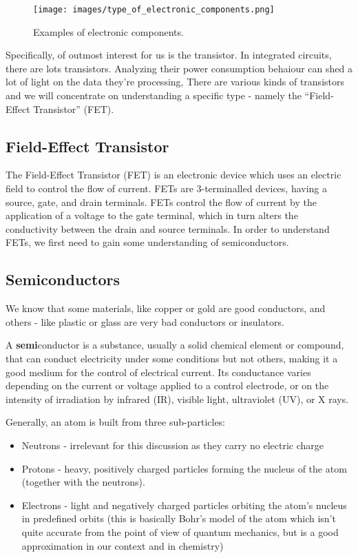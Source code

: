 \begin{figure}[!ht]
	\centering
	\texttt{[image: images/type\_of\_electronic\_components.png]}
	\caption{Examples of electronic components.} \label{fig:type_of_electronic_components}
\end{figure}

Specifically, of outmost interest for us is the transistor. 
In integrated circuits, there are lots transistors. Analyzing their power consumption behaiour can
shed a lot of light on the data they're processing,
There are various kinds of transistors and we will concentrate on understanding a
specific type - namely the ``Field-Effect Transistor'' (FET).

\subsection{Field-Effect Transistor}

The Field-Effect Transistor (FET) is an electronic device which uses an electric
field to control the flow of current. FETs are 3-terminalled devices, having a
source, gate, and drain terminals. FETs control the flow of current by the
application of a voltage to the gate terminal, which in turn alters the
conductivity between the drain and source terminals. In order to understand FETs,
we first need to gain some understanding of semiconductors.

\subsection{Semiconductors}

We know that some materials, like copper or gold are good conductors, and others - like plastic or glass are very bad conductors or insulators. 

A \textbf{semi}conductor is a substance, usually a solid chemical element or compound,
that can conduct electricity under some conditions but not others, making it a
good medium for the control of electrical current. Its conductance varies
depending on the current or voltage applied to a control electrode, or on the
intensity of irradiation by infrared (IR), visible light, ultraviolet (UV), or X
rays.

Generally, an atom is built from three sub-particles:
\begin{itemize}
    \item Neutrons - irrelevant for this discussion as they carry no electric charge
    \item Protons - heavy, positively charged particles forming the nucleus of the atom (together with the neutrons).
    \item Electrons - light and negatively charged particles orbiting the atom's nucleus in predefined orbits (this is basically Bohr's model of the atom which isn't quite accurate from the point of view of quantum mechanics, but is a good approximation in our context and in chemistry)
\end{itemize}

